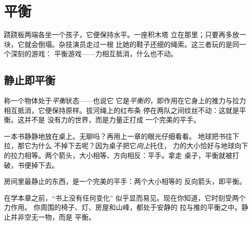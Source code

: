 \chapter{平衡}\label{ch:g2:balance-equilibrium}

跷跷板两端各坐一个孩子，它便保持水平。一座积木塔
立在那里；只要再多放一块，它就会倒塌。杂技演员走过一根
比她的鞋子还细的绳索。这三者玩的是同一个深刻的游戏：
平衡游戏——力相互抵消，什么也不动。

\section{静止即平衡}

\begin{definition}[平衡]\label{def:g2:balance-equilibrium:equilibrium}
称一个物体处于\emph{平衡}状态——也说它
它是\emph{平衡的}，即作用在它身上的推力与拉力
相互抵消，它便保持原样。拔河绳上的红布条
停在两队之间纹丝不动：这就是平衡。这并不是
没有力的世界，而是力量正打成
一个完美的平手。
\end{definition}

\begin{example}[桌上的书]\label{ex:g2:balance-equilibrium:book}
一本书静静地放在桌上。无聊吗？再用上一章的眼光仔细看看。
地球把书往下拉，那它为什么
不掉下去呢？因为桌子把它\emph{向上}托住，
力的大小恰好与地球向下的拉力相等。两个箭头，大小相等、方向相反：平手。拿走
桌子，平衡就被打破，书便掉下去。
\end{example}

\begin{omfigure}

{\small 房间里最静止的东西，是一个完美的平手：两个大小相等的
反向箭头，即平衡。}
\end{omfigure}

\begin{remark}[静止并不等于无力]\label{rem:g2:balance-equilibrium:notfree}
在学本章之前，“书上没有任何变化”
似乎显而易见。现在你知道，它时刻受两个力作用。
你周围的椅子、灯、房屋和山峰，都处于安静的
拉与推的平衡之中。静止并非空无一物，而是
平衡。
\end{remark}

